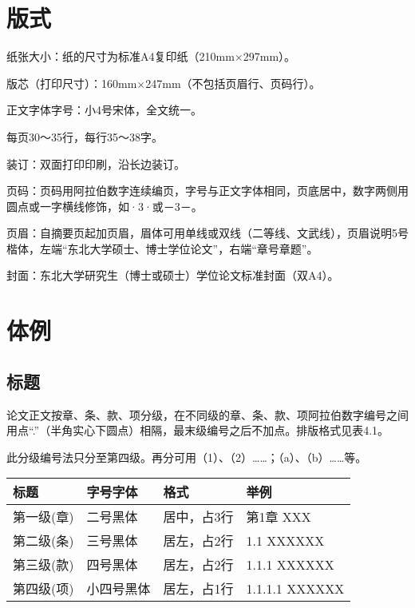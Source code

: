 \section{版式}
纸张大小：纸的尺寸为标准A4复印纸（210mm×297mm）。

版芯（打印尺寸）：160mm×247mm（不包括页眉行、页码行）。

正文字体字号：小4号宋体，全文统一。

每页30～35行，每行35～38字。

装订：双面打印印刷，沿长边装订。

页码：页码用阿拉伯数字连续编页，字号与正文字体相同，页底居中，数字两侧用圆点或一字横线修饰，如·3·或－3－。

页眉：自摘要页起加页眉，眉体可用单线或双线（二等线、文武线），页眉说明5号楷体，左端“东北大学硕士、博士学位论文”，右端“章号章题”。

封面：东北大学研究生（博士或硕士）学位论文标准封面（双A4）。

\section{体例}

\subsection{标题}

论文正文按章、条、款、项分级，在不同级的章、条、款、项阿拉伯数字编号之间用点“.”（半角实心下圆点）相隔，最末级编号之后不加点。排版格式见表4.1。

此分级编号法只分至第四级。再分可用（1）、（2）……；（a）、（b）……等。

\begin{table}[htpb]
    \begin{center}
        \begin{tabular}{|l | l | l | l |}
            \hline
            标题       & 字号字体   & 格式        & 举例           \\
            \hline
            第一级(章) & 二号黑体   & 居中，占3行 & 第1章 XXX      \\
            \hline
            第二级(条) & 三号黑体   & 居左，占2行 & 1.1 XXXXXX     \\
            \hline
            第三级(款) & 四号黑体   & 居左，占2行 & 1.1.1 XXXXXX   \\
            \hline
            第四级(项) & 小四号黑体 & 居左，占1行 & 1.1.1.1 XXXXXX \\
            \hline
        \end{tabular}
    \end{center}
\end{table}

